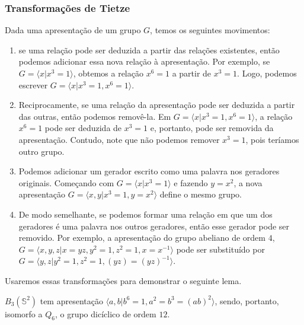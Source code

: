 	\subsubsection{Transformações de Tietze}
	\hspace{12pt} Dada uma apresentação de um grupo $G$, temos os seguintes movimentos:
	\begin{enumerate}
		\item se uma relação pode ser deduzida a partir das relações existentes, então podemos adicionar essa nova relação à apresentação. Por exemplo, se $G = \langle x|x^3=1 \rangle$, obtemos a relação $x^6 = 1$ a partir de $x^3=1$. Logo, podemos escrever $G = \langle x|x^3=1,x^6=1 \rangle$.
		\item Reciprocamente, se uma relação da apresentação pode ser deduzida a partir das outras, então podemos removê-la. Em $G = \langle x|x^3=1,x^6=1 \rangle$, a relação $x^6=1$ pode ser deduzida de $x^3=1$ e, portanto, pode ser removida da apresentação. Contudo, note que não podemos remover $x^3=1$, pois teríamos outro grupo.
		\item Podemos adicionar um gerador escrito como uma palavra nos geradores originais. Começando com $G = \langle x|x^3=1 \rangle$ e fazendo $y=x^2$, a nova apresentação $G = \langle x,y|x^3=1,y=x^2 \rangle$ define o mesmo grupo.
		\item De modo semelhante, se podemos formar uma relação em que um dos geradores é uma palavra nos outros geradores, então esse gerador pode ser removido. Por exemplo, a apresentação do grupo abeliano de ordem $4$, $G = \langle x,y,z|x=yz, y^2=1, z^2=1, x=x^{-1} \rangle$ pode ser substituído por $G = \langle y,z|y^2=1,z^2=1,(yz)=(yz)^{-1} \rangle$.
	\end{enumerate}
	
	\par\vspace{0.3cm} Usaremos essas transformações para demonstrar o seguinte lema.
	
	\begin{lemma}
		\label{B_3(S^2) tem ordem 12}
		$B_3(\mathbb{S}^2)$ tem apresentação $\langle a,b|b^6=1,a^2=b^3=(ab)^2 \rangle$, sendo, portanto, isomorfo a $Q_6$, o grupo dicíclico de ordem $12$. 
	\end{lemma} 
	
